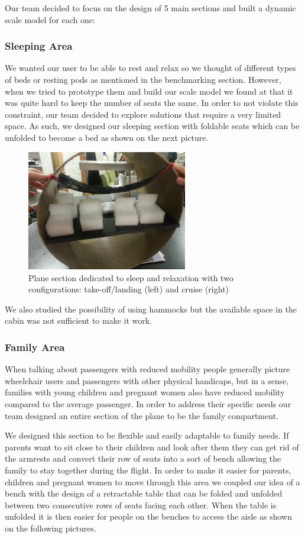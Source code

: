 Our team decided to focus on the design of 5 main sections and built a dynamic scale model for each one:

\subsubsection{Sleeping Area}
We wanted our user to be able to rest and relax so we thought of different types of beds or resting pods as mentioned in the benchmarking section. However, when we tried to prototype them and build our scale model we found at that it was quite hard to keep the number of seats the same. In order to not violate this constraint, our team decided to explore solutions that require a very limited space. As such, we designed our sleeping section with foldable seats which can be unfolded to become a bed as shown on the next picture.

\begin{figure}[h]
  \centering
     \includegraphics[width=7cm]{images/20140116_172733.jpg}
   \caption{Plane section dedicated to sleep and relaxation with two configurations: take-off/landing (left) and cruise (right)}
  \label{fig:20140116_172733}
\end{figure}

We also studied the possibility of using hammocks but the available space in the cabin was not sufficient to make it work.

\subsubsection{Family Area}
When talking about passengers with reduced mobility people generally picture wheelchair users and passengers with other physical handicaps, but in a sense, families with young children and pregnant women also have reduced mobility compared to the average passenger. In order to address their specific needs our team designed an entire section of the plane to be the family compartment.

We designed this section to be flexible and easily adaptable to family needs. If parents want to sit close to their children and look after them they can get rid of the armrests and convert their row of seats into a sort of bench allowing the family to stay together during the flight. In order to make it easier for parents, children and pregnant women to move through this area we coupled our idea of a bench with the design of a retractable table that can be folded and unfolded between two consecutive rows of seats facing each other. When the table is unfolded it is then easier for people on the benches to access the aisle as shown on the following pictures. 

